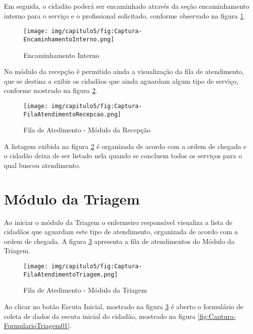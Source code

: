 Em seguida, o cidadão poderá ser encaminhado através da seção encaminhamento interno para o serviço e o profissional solicitado, conforme observado na figura \ref{fig:Captura-EncaminhamentoInterno}.

\begin{figure}[H]
    \centering
     \caption{Encaminhamento Interno}
    \texttt{[image: img/capitulo5/fig:Captura-EncaminhamentoInterno.png]}
    \label{fig:Captura-EncaminhamentoInterno}
\end{figure}

No módulo da recepção é permitido ainda a visualização da fila de atendimento, que se destina a exibir os cidadãos que ainda aguardam algum tipo de serviço, conforme mostrado na figura \ref{fig:Captura-FilaAtendimentoRecepcao}.


\begin{figure}[H]
    \centering
     \caption{Fila de Atedimento - Módulo da Recepção}
    \texttt{[image: img/capitulo5/fig:Captura-FilaAtendimentoRecepcao.png]}
    \label{fig:Captura-FilaAtendimentoRecepcao}
\end{figure}

A listagem exibida na figura \ref{fig:Captura-FilaAtendimentoRecepcao} é organizada de acordo com a ordem de chegada e o cidadão deixa de ser listado nela quando se concluem todos os serviços para o qual buscou atendimento.

\section{Módulo da Triagem}

Ao iniciar o módulo da Triagem o enfermeiro responsável visualiza a lista de cidadãos que aguardam este tipo de atendimento, organizada de acordo com a ordem de chegada. A figura \ref{fig:Captura-FilaAtendimentoTriagem} apresenta a fila de atendimentos do Módulo da Triagem.

\begin{figure}[H]
    \centering
     \caption{Fila de Atedimento - Módulo da Triagem}
    \texttt{[image: img/capitulo5/fig:Captura-FilaAtendimentoTriagem.png]}
    \label{fig:Captura-FilaAtendimentoTriagem}
\end{figure}

Ao clicar no botão Escuta Inicial, mostrado na figura \ref{fig:Captura-FilaAtendimentoTriagem} é aberto o formulário de coleta de dados da escuta inicial do cidadão, mostrado na figura \ref{fig:Captura-FormularioTriagem01}.

